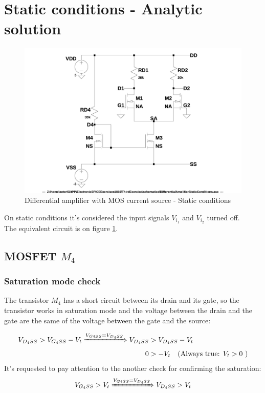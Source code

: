 \documentclass[10pt,a4paper]{book}
\begin{document}
\section{Static conditions - Analytic solution}

\begin{figure}[h]
  \centering
  \includegraphics[width=12cm]{schematics/DifferentialAmplifierStaticConditions.jpg}
  \caption{Differential amplifier with MOS current source - Static conditions}
  \label{DifferentialAmplifierStaticConditions}
\end{figure}

On static conditions it's considered the input signals $V_{i_1}$ and $V_{i_2}$ turned off.\\
The equivalent circuit is on figure \ref{DifferentialAmplifierStaticConditions}.\par

\subsection{MOSFET $M_4$}
\subsubsection{Saturation mode check}\label{M4SatCheck}
The transistor $M_4$ has a short circuit between its drain and its gate, so the transistor works in saturation mode and the voltage between the drain and the gate are the same of the voltage between the gate and the source:\par
\begin{align}
V_{{D_4}SS} > V_{{G_4}SS} - V_t \xRightarrow{V_{{G4}SS} = V_{{D_4}SS}}
V_{{D_4}SS} &> V_{{D_4}SS} - V_t\\
0 &> - V_t \quad \text{(Always true: }V_t > 0\text{ )}
\end{align}
It's requested to pay attention to the another check for confirming the saturation:
\begin{gather}
V_{{G_4}SS} > V_t \xRightarrow{V_{{G4}SS} = V_{{D_4}SS}} V_{{D_4}SS} > V_t
\end{gather}
\end{document}
